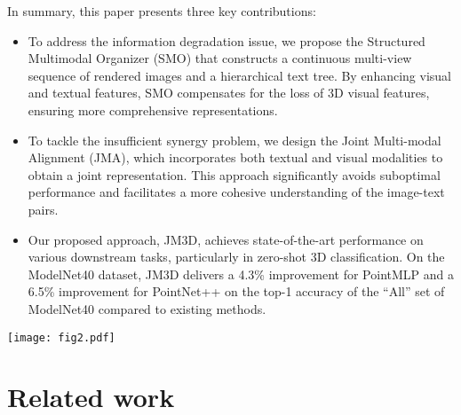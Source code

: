 \documentclass[sigconf]{acmart}
\begin{document}
In summary, this paper presents three key contributions:
\begin{itemize}
    \item To address the information degradation issue, we propose the Structured Multimodal Organizer (SMO) that constructs a continuous multi-view sequence of rendered images and a hierarchical text tree. By enhancing visual and textual features, SMO compensates for the loss of 3D visual features, ensuring more comprehensive representations. 

    \item To tackle the insufficient synergy problem, we design the Joint Multi-modal Alignment (JMA), which incorporates both textual and visual modalities to obtain a joint representation. This approach significantly avoids suboptimal performance and facilitates a more cohesive understanding of the image-text pairs. 

    \item Our proposed approach, JM3D, achieves state-of-the-art performance on various downstream tasks, particularly in zero-shot 3D classification. On the ModelNet40 dataset, JM3D delivers a 4.3\% improvement for PointMLP and a 6.5\% improvement for PointNet++ on the top-1 accuracy of the ``All'' set of ModelNet40 compared to existing methods. \end{itemize}

\begin{figure*}[]
\centering
\texttt{[image: fig2.pdf]}

\vspace{-0.25cm}
\caption{The framework of JM3D. Continuous Image Sequence {\color{green}(CIS)} and Hierarchical Text Tree {\color{orange}(HTT)} organized continuous multi-view images and hierarchical texts respectively, which are fed into a pre-training model (frozen) to extract features on the left. Then, Joint Multi-modal Alignment {\color{gray}(JMA)} incorporates the features from two modalities to generate the joint modeling features. On the last, contrastive learning is applied to align 3D features (training) with joint features and subcategory texts, while 3D features are aggregated with the assistance of the parent category.}
\label{fig2}
\end{figure*}

\section{Related work}
\end{document}

